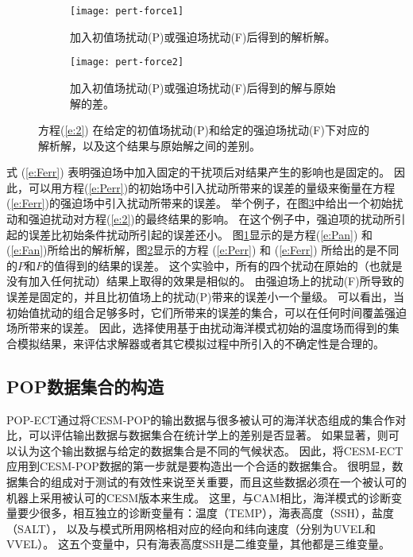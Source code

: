\begin {figure} 
\centering
\begin{subfigure}[t]{1\textwidth}
\centering
\texttt{[image: pert-force1]}
\caption{加入初值场扰动(P)或强迫场扰动(F)后得到的解析解。\label{fig:1Danalytical1}}
\vspace{10pt}
\end{subfigure}
\begin{subfigure}[b]{1\textwidth}
\centering
\texttt{[image: pert-force2]}
\caption{加入初值场扰动(P)或强迫场扰动(F)后得到的解与原始解的差。\label{fig:1Danalytical2}}
\vspace{10pt}
\end{subfigure}
\caption{方程(\ref{e:2}) 在给定的初值场扰动(P)和给定的强迫场扰动(F)下对应的解析解，以及这个结果与原始解之间的差别。}
\label{fig:1Danalytical}
\end {figure}

式 (\ref{e:Ferr}) 表明强迫场中加入固定的干扰项后对结果产生的影响也是固定的。
因此，可以用方程(\ref{e:Perr})的初始场中引入扰动所带来的误差的量级来衡量在方程(\ref{e:Ferr})的强迫场中引入扰动所带来的误差。 
举个例子，在图\ref{fig:1Danalytical}中给出一个初始扰动和强迫扰动对方程(\ref{e:2})的最终结果的影响。
在这个例子中，强迫项的扰动所引起的误差比初始条件扰动所引起的误差还小。
图\ref{fig:1Danalytical1}显示的是方程(\ref{e:Pan}) 和 (\ref{e:Fan})所给出的解析解，图\ref{fig:1Danalytical2}显示的方程 (\ref{e:Perr}) 和 (\ref{e:Ferr}) 所给出的是不同的$P$和$F$的值得到的结果的误差。
这个实验中，所有的四个扰动在原始的（也就是没有加入任何扰动）结果上取得的效果是相似的。 
由强迫场上的扰动(F)所导致的误差是固定的，并且比初值场上的扰动(P)带来的误差小一个量级。
可以看出，当初始值扰动的组合足够多时，它们所带来的误差的集合，可以在任何时间覆盖强迫场所带来的误差。 
因此，选择使用基于由扰动海洋模式初始的温度场而得到的集合模拟结果，来评估求解器或者其它模拟过程中所引入的不确定性是合理的。



\subsection{POP数据集合的构造}\label{verify:createEns}

 
POP-ECT通过将CESM-POP的输出数据与很多被认可的海洋状态组成的集合作对比，可以评估输出数据与数据集合在统计学上的差别是否显著。
如果显著，则可以认为这个输出数据与给定的数据集合是不同的气候状态。 
因此，将CESM-ECT应用到CESM-POP数据的第一步就是要构造出一个合适的数据集合。 
很明显，数据集合的组成对于测试的有效性来说至关重要，而且这些数据必须在一个被认可的机器上采用被认可的CESM版本来生成。
这里，与CAM相比，海洋模式的诊断变量要少很多，相互独立的诊断变量有：温度（TEMP），海表高度（SSH），盐度（SALT）， 以及与模式所用网格相对应的经向和纬向速度（分别为UVEL和VVEL）。
这五个变量中，只有海表高度SSH是二维变量，其他都是三维变量。 


